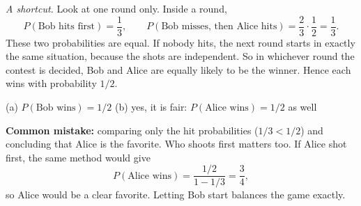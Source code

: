 \begin{solution}
	\emph{A shortcut.} Look at one round only. Inside a round,
	\[ P(\text{Bob hits first})=\frac13,\qquad
		P(\text{Bob misses, then Alice hits})=\frac23\cdot\frac12=\frac13. \]
	These two probabilities are equal. If nobody hits, the next round starts
	in exactly the same situation, because the shots are independent. So in
	whichever round the contest is decided, Bob and Alice are equally likely
	to be the winner. Hence each wins with probability $1/2$.
	\begin{answer}
		(a) $P(\text{Bob wins})=1/2$ \quad (b) yes, it is fair:
		$P(\text{Alice wins})=1/2$ as well
	\end{answer}
	\begin{remark}
		\textbf{Common mistake:} comparing only the hit probabilities
		($1/3<1/2$) and concluding that Alice is the favorite. Who
		shoots first matters too. If Alice shot first, the same method would
		give
		\[ P(\text{Alice wins})=\frac{1/2}{1-1/3}=\frac34, \]
		so Alice would be a clear favorite. Letting Bob start balances the game
		exactly.
	\end{remark}
\end{solution}
